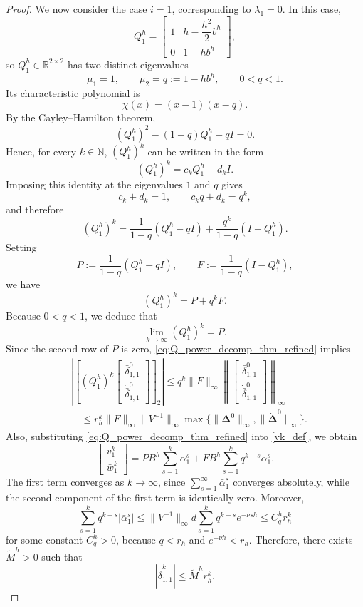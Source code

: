 \documentclass[10pt,a4paper]{amsart}
\begin{document}
\begin{proof}
We now consider the case \(i=1\), corresponding to \(\lambda_1=0\). In this case,
\[
Q_1^h=
\begin{bmatrix}
1 & h-\dfrac{h^2}{2}b^h\\[6pt]
0 & 1-hb^h
\end{bmatrix},
\]
so \(Q_1^h\in\mathbb R^{2\times2}\) has two distinct eigenvalues
\[
\mu_1=1,
\qquad
\mu_2=q:=1-hb^h,
\qquad 0<q<1.
\]
Its characteristic polynomial is
\[
\chi(x)=(x-1)(x-q).
\]
By the Cayley--Hamilton theorem,
\[
(Q_1^h)^2-(1+q)Q_1^h+qI=0.
\]
Hence, for every \(k\in\mathbb N\), \((Q_1^h)^k\) can be written in the form
\[
(Q_1^h)^k=c_k Q_1^h+d_k I.
\]
Imposing this identity at the eigenvalues \(1\) and \(q\) gives
\[
c_k+d_k=1,
\qquad
c_k q+d_k=q^k,
\]
and therefore
\[
(Q_1^h)^k
=
\frac{1}{1-q}(Q_1^h-qI)+\frac{q^k}{1-q}(I-Q_1^h).
\]
Setting
\[
P:=\frac{1}{1-q}(Q_1^h-qI),
\qquad
F:=\frac{1}{1-q}(I-Q_1^h),
\]
we have
\begin{equation}\label{eq:Q_power_decomp_thm_refined}
(Q_1^h)^k=P+q^kF.
\end{equation}
Because $0<q<1$, we deduce that
\[
\lim_{k\to\infty}(Q_1^h)^k=P.
\]
Since the second row of \(P\) is zero, \eqref{eq:Q_power_decomp_thm_refined} implies
\[
\begin{split}
&\left|
\left[
(Q_1^h)^k
\begin{bmatrix}
\bar{\delta}_{1,1}^{0}\\[5pt]
\dot{\bar{\delta}}_{1,1}^{0}
\end{bmatrix}
\right]_2
\right|
\le
q^k\|F\|_\infty
\left\|
\begin{bmatrix}
\bar{\delta}_{1,1}^{0}\\[5pt]
\dot{\bar{\delta}}_{1,1}^{0}
\end{bmatrix}
\right\|_\infty
\\&\quad\le
r_h^k\|F\|_\infty\|V^{-1}\|_\infty
\max\{\|\bm{\Delta}^0\|_\infty,\|\dot{\bm{\Delta}}^0\|_\infty\}.
\end{split}
\]
Also, substituting \eqref{eq:Q_power_decomp_thm_refined} into \eqref{vk_def}, we obtain
\[
\begin{bmatrix}
\bar{v}_1^k \\[5pt]
\bar{w}_1^k
\end{bmatrix}
=
PB^h\sum_{s=1}^{k}\bar{\alpha}_1^s
+
FB^h\sum_{s=1}^{k}q^{k-s}\bar{\alpha}_1^s.
\]
The first term converges as \(k\to\infty\), since \(\sum_{s=1}^\infty \bar{\alpha}_1^s\) converges absolutely, while the second component of the first term is identically zero. Moreover,
\[
\sum_{s=1}^{k} q^{k-s}|\bar{\alpha}_1^s|
\le
\|V^{-1}\|_\infty d
\sum_{s=1}^{k} q^{k-s}e^{-\nu sh}
\le C_q^h r_h^k
\]
for some constant \(C_q^h>0\), because \(q<r_h\) and \(e^{-\nu h}<r_h\). Therefore, there exists \(\widetilde M^h>0\) such that
\[
|\dot{\bar{\delta}}_{1,1}^{k}|
\le
\widetilde M^h r_h^k.
\]


\end{proof}
\end{document}
